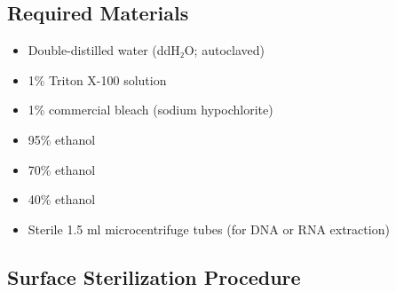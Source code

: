 \documentclass[
  11pt,
]{article}
\providecommand{\tightlist}{%
  \setlength{\itemsep}{0pt}\setlength{\parskip}{0pt}}
\begin{document}
\subsection{Required Materials}\label{required-materials}

\begin{itemize}
\tightlist
\item
  Double-distilled water (ddH₂O; autoclaved)\\
\item
  1\% Triton X-100 solution\\
\item
  1\% commercial bleach (sodium hypochlorite)\\
\item
  95\% ethanol\\
\item
  70\% ethanol\\
\item
  40\% ethanol\\
\item
  Sterile 1.5 ml microcentrifuge tubes (for DNA or RNA extraction)
\end{itemize}

\subsection{Surface Sterilization
Procedure}\label{surface-sterilization-procedure}
\end{document}
